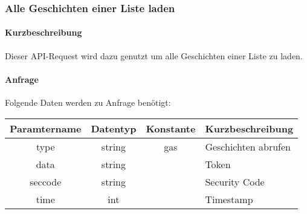 \subsubsection{Alle Geschichten einer Liste laden}
\paragraph{Kurzbeschreibung}Dieser API-Request wird dazu genutzt um  alle Geschichten einer Liste zu laden.
\paragraph{Anfrage}Folgende Daten werden zu Anfrage benötigt:
\begin{table}[H]
	\begin{tabular}{|c|c|c|p{6.5cm}|}
		\hline
		\textbf{Paramtername} & \textbf{Datentyp} & \textbf{Konstante} & \textbf{Kurzbeschreibung}                                                                                               \\ \hline
		type                & string            & gas                & Geschichten abrufen \\ \hline
		data                & string            &                    & Token \\ \hline
		seccode             & string            &                    & Security Code \\ \hline
		time                & int               &                    & Timestamp \\ \hline
	\end{tabular}
\end{table}
